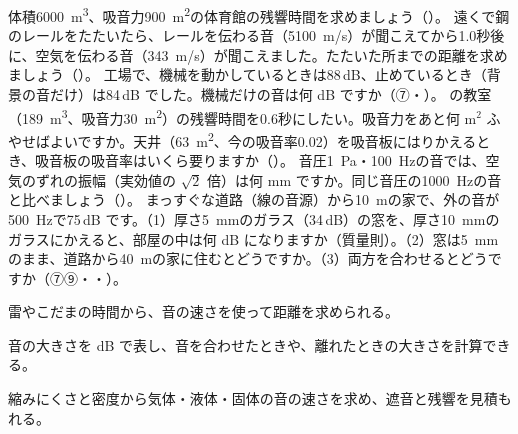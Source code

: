\bkproblem 体積\qty{6000}{m^3}、吸音力\qty{900}{m^2}の体育館の残響時間を求めましょう（\nobreak{}\nobreak）。
\bkproblem 遠くで鋼のレールをたたいたら、レールを伝わる音（\qty{5100}{m/s}）が聞こえてから1.0秒後に、空気を伝わる音（\qty{343}{m/s}）が聞こえました。たたいた所までの距離を求めましょう（\nobreak{}\nobreak）。
\bkproblem 工場で、機械を動かしているときは88\,dB、止めているとき（背景の音だけ）は84\,dB でした。機械だけの音は何 dB ですか（⑦・）。
\bkproblem {}の教室（\qty{189}{m^3}、吸音力\qty{30}{m^2}）の残響時間を0.6秒にしたい。吸音力をあと何 m$^2$ ふやせばよいですか。天井（\qty{63}{m^2}、今の吸音率0.02）を吸音板にはりかえるとき、吸音板の吸音率はいくら要りますか（\nobreak{}\nobreak）。
\bkproblem 音圧\qty{1}{Pa}・\qty{100}{Hz}の音では、空気のずれの振幅（実効値の $\sqrt2$ 倍）は何 mm ですか。同じ音圧の\qty{1000}{Hz}の音と比べましょう（\nobreak{}\nobreak）。
\bkproblem まっすぐな道路（線の音源）から\qty{10}{m}の家で、外の音が\qty{500}{Hz}で75\,dB です。（1）厚さ\qty{5}{mm}のガラス（34\,dB）の窓を、厚さ\qty{10}{mm}のガラスにかえると、部屋の中は何 dB になりますか（質量則）。（2）窓は\qty{5}{mm}のまま、道路から\qty{40}{m}の家に住むとどうですか。（3）両方を合わせるとどうですか（⑦⑨・・）。

\begin{furikaeri}
\begin{checklist}
\item 雷やこだまの時間から、音の速さを使って距離を求められる。
\item 音の大きさを dB で表し、音を合わせたときや、離れたときの大きさを計算できる。
\item 縮みにくさと密度から気体・液体・固体の音の速さを求め、遮音と残響を見積もれる。
\end{checklist}
\end{furikaeri}
